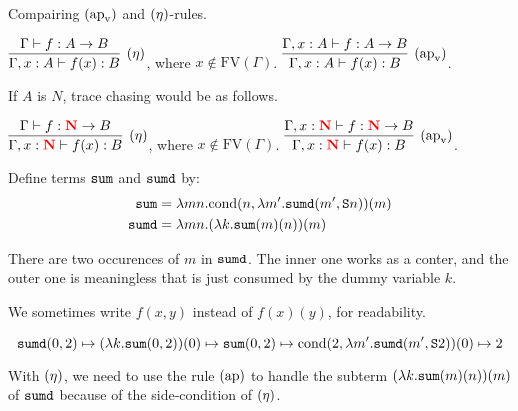 \documentclass{article}
\newcommand{\bfColor}[2]{{\bf \color{#1}{#2}}}
\newcommand{\Rapv}{\hbox{$(\text{ap}_{\text{v}})$}}
\newcommand{\Reta}{\hbox{$(\eta)$}}
\newcommand{\Rap}{\hbox{$(\text{ap})$}}
\newcommand{\FV}[1]{\text{FV}(#1)}
\newcommand{\Sum}{{\tt sum}}
\newcommand{\Sumd}{{\tt sumd}}
\newcommand{\Cond}[2]{\text{cond}(#1,#2)}
\newcommand{\Suc}[1]{{\tt S}#1}
\newcommand{\N}{N}
\newcommand{\rN}{\bfColor{red}{N}}
\newenvironment{example}[1][Example]{\begin{trivlist}
\item[\hskip \labelsep {\bfseries #1}]}{\end{trivlist}}
\newenvironment{remark}[1][Remark]{\begin{trivlist}
\item[\hskip \labelsep {\bfseries #1}]}{\end{trivlist}}
\begin{document}
Compairing $\Rapv$ and $\Reta$-rules.
\begin{center}
  $\infer[\Reta]{
    \Gamma,x:A \vdash f(x):B
  }{
    \Gamma \vdash f:A\to B
  }$, where $x\not\in\FV{\Gamma}$. 
  \hspace{1cm}
  $\infer[\Rapv]{
    \Gamma, x:A \vdash f(x):B
  }{
    \Gamma, x:A \vdash f: A\to B
  }$. 
\end{center}

If $A$ is $\N$, trace chasing would be as follows. 

\begin{center}
  $\infer[\Reta]{
    \Gamma,x:\rN \vdash f(x):B
  }{
    \Gamma \vdash f:\rN\to B
  }$, where $x\not\in\FV{\Gamma}$. 
  \hspace{1cm}
  $\infer[\Rapv]{
    \Gamma, x:\rN \vdash f(x):B
  }{
    \Gamma, x:\rN \vdash f: \rN\to B
  }$. 
\end{center}



Define terms $\Sum$ and $\Sumd$ by:
\begin{align*}
  \Sum &= \lambda mn.\Cond{n}{\lambda m'.\Sumd(m',\Suc{n})}(m)
  \\
  \Sumd &= \lambda mn.(\lambda k.\Sum(m)(n))(m)
\end{align*}

\begin{remark}\rm
  There are two occurences of $m$ in $\Sumd$.
  The inner one works as a conter,
  and the outer one is meaningless that is just consumed by the dummy variable $k$. 
\end{remark}

We sometimes write $f(x,y)$ instead of $f(x)(y)$, for readability. 
\\

\begin{example}
\[
\Sumd(0,2)
\mapsto
(\lambda k.\Sum(0,2))(0)
\mapsto
\Sum(0,2)
\mapsto
\Cond{2}{\lambda m'.\Sumd(m',\Suc{2})}(0)
\mapsto
2
\]
\end{example}

With $\Reta$, we need to use the rule $\Rap$ to handle
the subterm $(\lambda k.\Sum(m)(n))(m)$ of $\Sumd$
because of the side-condition of $\Reta$.
\end{document}
